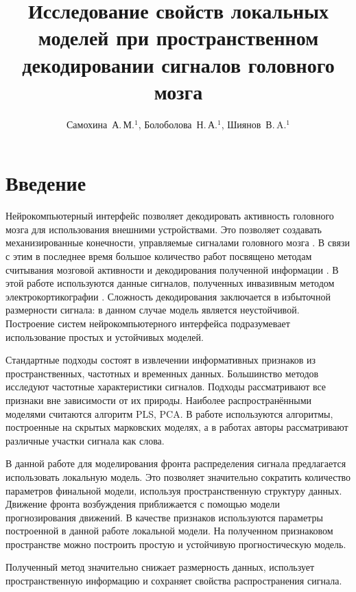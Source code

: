 \documentclass[12pt,twoside]{article}
\title
    [Исследование свойств локальных моделей при пространственном декодировании сигналов головного мозга] 
    {Исследование свойств локальных моделей при пространственном декодировании сигналов головного мозга}
\author
    [Самохина~А.\,М.] %
    {Самохина~А.\,М.$^1$, Болоболова~Н.\,А.$^1$, Шиянов~В.\,A.$^1$} %
\begin{document}
\maketitle
\bigskip
\bigskip
\bigskip
\bigskip
\maketitleSecondary

\section{Введение}
Нейрокомпьютерный интерфейс позволяет декодировать активность головного мозга для использования внешними устройствами. Это позволяет создавать механизированные конечности, управляемые сигналами головного мозга \cite{Donoghue2008}. В связи с этим в последнее время большое количество работ посвящено методам считывания мозговой активности и декодирования полученной информации \cite{Hu2018}\cite{Song2017}\cite{Loza2017}\cite{Eliseyev2016}\cite{Gaglianese2016}\cite{Bundy2016}\cite{Morishita2014}.
В этой работе используются данные сигналов, полученных инвазивным методом электрокортикографии \cite{Sirven2014}. Сложность декодирования заключается в избыточной размерности сигнала: в данном случае модель является неустойчивой. Построение систем нейрокомпьютерного интерфейса подразумевает использование простых и устойчивых моделей. 

Стандартные подходы состоят в извлечении информативных признаков из пространственных, частотных и временных данных\cite{Morishita2014}\cite{Alexander2013}. Большинство методов исследуют частотные характеристики сигналов\cite{Chin2007}. Подходы \cite{Eliseyev2016}\cite{Motrenko2018} рассматривают все признаки вне зависимости от их природы. Наиболее распространёнными моделями считаются алгоритм PLS\cite{Rosipal2006}\cite{Eliseyev2016}, PCA\cite{Zhao2010}. В работе \cite{Zhao2014} используются алгоритмы, построенные на скрытых марковских моделях, а в  работах \cite{Loza2017}\cite{Song2017} авторы рассматривают различные участки сигнала как слова. 

В данной работе для моделирования фронта распределения сигнала предлагается использовать локальную модель. Это позволяет значительно сократить количество параметров финальной модели, используя пространственную структуру данных. Движение фронта возбуждения приближается с помощью модели прогнозирования движений. В качестве признаков используются параметры построенной в данной работе локальной модели. На полученном признаковом пространстве можно построить простую и устойчивую прогностическую модель.


Полученный  метод значительно снижает размерность данных,  использует пространственную информацию и сохраняет свойства распространения сигнала.
\end{document}

